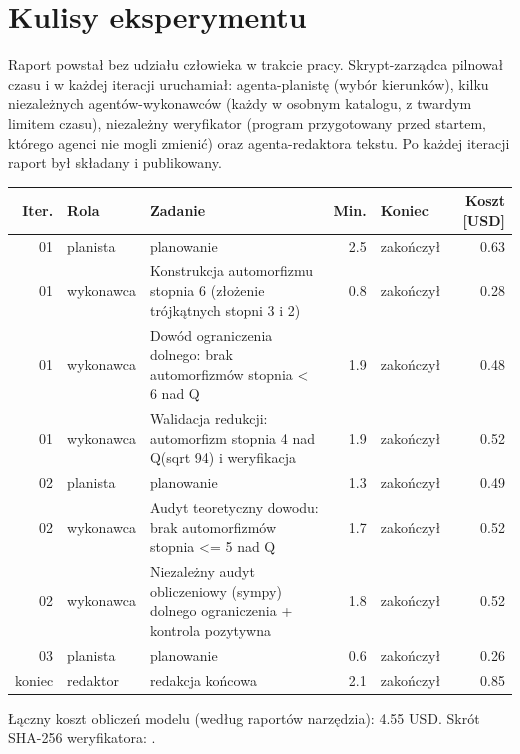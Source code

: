 \section{Kulisy eksperymentu}
Raport powstał bez udziału człowieka w trakcie pracy. Skrypt-zarządca pilnował czasu i w każdej iteracji uruchamiał: agenta-planistę (wybór kierunków), kilku niezależnych agentów-wykonawców (każdy w osobnym katalogu, z twardym limitem czasu), niezależny weryfikator (program przygotowany przed startem, którego agenci nie mogli zmienić) oraz agenta-redaktora tekstu. Po każdej iteracji raport był składany i publikowany.

\begin{center}\small\begin{longtable}{rlp{6.2cm}rlr}\toprule Iter. & Rola & Zadanie & Min. & Koniec & Koszt [USD]\\\midrule\endhead
01 & planista & planowanie  & 2.5 & zakończył & 0.63\\
01 & wykonawca & Konstrukcja automorfizmu stopnia 6 (złożenie trójkątnych stopni 3 i 2)  & 0.8 & zakończył & 0.28\\
01 & wykonawca & Dowód ograniczenia dolnego: brak automorfizmów stopnia < 6 nad Q  & 1.9 & zakończył & 0.48\\
01 & wykonawca & Walidacja redukcji: automorfizm stopnia 4 nad Q(sqrt 94) i weryfikacja  & 1.9 & zakończył & 0.52\\
02 & planista & planowanie  & 1.3 & zakończył & 0.49\\
02 & wykonawca & Audyt teoretyczny dowodu: brak automorfizmów stopnia <= 5 nad Q  & 1.7 & zakończył & 0.52\\
02 & wykonawca & Niezależny audyt obliczeniowy (sympy) dolnego ograniczenia + kontrola pozytywna  & 1.8 & zakończył & 0.52\\
03 & planista & planowanie  & 0.6 & zakończył & 0.26\\
koniec & redaktor & redakcja końcowa  & 2.1 & zakończył & 0.85\\
\bottomrule\end{longtable}\end{center}
Łączny koszt obliczeń modelu (według raportów narzędzia): 4.55 USD. Skrót SHA-256 weryfikatora: \texttt{\hashWeryfikatora}.
